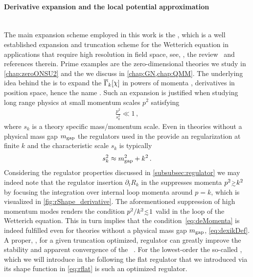 \paragraph{Derivative expansion and the local potential approximation}\label{paragraph:derivativeExpansion}\mbox{} \\
The main \frg{} expansion scheme employed in this work is the \de{}, which is a well established expansion and truncation scheme for the Wetterich equation in applications that require high resolution in field space, see, \eg{}, the review~\cite{Dupuis:2020fhh} and references therein.
Prime examples are the zero-dimensional theories we study in \cref{chap:zeroONSU2} and the \loefts{} we discuss in \cref{chap:GN,chap:QMM}.
The underlying idea behind the \de{} is to expand the \rgscaledependent{} \eaa{} $\FSeaa_k[\FSmf{\FSsf}]$ in powers of momenta \dash{} \ie{}, derivatives in position space, hence the name \de{}.
Such an expansion is justified when studying long range physics at small momentum scales $p^2$ satisfying
\begin{align}
	\frac{p^2}{s_k^2}\ll 1\,,
	\label{eq:deMomenta}
\end{align}
where $s_k$ is a theory specific \ir{} mass/momentum scale.
Even in theories without a physical mass gap $m_{\mathrm{gap}}$ the regulators used in the \frg{} provide an \ir{} regularization at finite $k$ and the characteristic scale $s_k$ is typically
\begin{align}
	s_k^2\approx m_{\mathrm{gap}}^2+k^2\,.
	\label{eq:dexikDef}
\end{align}
Considering the regulator properties discussed in \cref{subsubsec:regulator} we may indeed note that the regulator insertion $\partial_t R_k$ in the \frgEquation{} suppresses momenta $p^2\smallergtrsim k^2$ by focusing the integration over internal loop momenta around $p=k$, which is visualized in \cref{fig:rShape_derivative}.
The aforementioned suppression of high momentum modes renders the condition $p^2/k^2\smallerlesssim 1$ valid in the loop of the Wetterich equation.
This in turn implies that the condition~\eqref{eq:deMomenta} is indeed fulfilled \dash{} even for theories without a physical \ir{} mass gap $m_{\mathrm{gap}}$, \cf{} \cref{eq:dexikDef}.
A proper, \ie{}, for a given truncation optimized, regulator can greatly improve the stability and apparent convergence of the \de{}~\cite{Pawlowski:2005xe,Litim:2000ci,Litim:2001up}.
For the lowest-order \de{} \dash{} the so-called , which we will introduce in the following \dash{} the flat regulator that we introduced via its shape function in \cref{eq:rflat} is such an optimized regulator.

